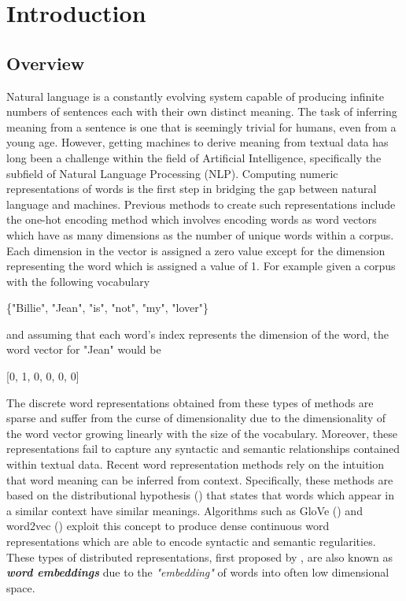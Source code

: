 \chapter{Introduction}
\label{chap:intro}
\section{Overview}
Natural language is a constantly evolving system capable of producing infinite numbers of sentences each with their own distinct meaning. The task of inferring meaning from a sentence is one that is seemingly trivial for humans, even from a young age. However, getting machines to derive meaning from textual data has long been a challenge within the field of Artificial Intelligence, specifically the subfield of Natural Language Processing (NLP). Computing numeric representations of words is the first step in bridging the gap between natural language and machines. Previous methods to create such representations include the one-hot encoding method which involves encoding words as word vectors which have as many dimensions as the number of unique words within a corpus. Each dimension in the vector is assigned a zero value except for the dimension representing the word which is assigned a value of 1. For example given a corpus with the following vocabulary 

\begin{center}
\{"Billie", "Jean", "is", "not", "my", "lover"\}
\end{center}

\noindent
and assuming that each word's index represents the dimension of the word, the word vector for "Jean" would be 

\begin{center}
	[0, 1, 0, 0, 0, 0]
\end{center}

\noindent
\newline
The discrete word representations obtained from these types of methods are sparse and suffer from the curse of dimensionality due to the dimensionality of the word vector growing linearly with the size of the vocabulary. Moreover, these representations fail to capture any syntactic and semantic relationships contained within textual data. Recent word representation methods rely on the intuition that word meaning can be inferred from context. Specifically, these methods are based on the distributional hypothesis (\cite{Harris1954}) that states that words which appear in a similar context have similar meanings. Algorithms such as GloVe (\cite{Pennington2014}) and word2vec (\cite{Mikolov2013}) exploit this concept to produce dense continuous word representations which are able to encode syntactic and semantic regularities. These types of distributed representations, first proposed by \cite{Hinton1986},  are also known as \textit{\textbf{word embeddings}} due to the \textit{"embedding"} of words into often low dimensional space.

